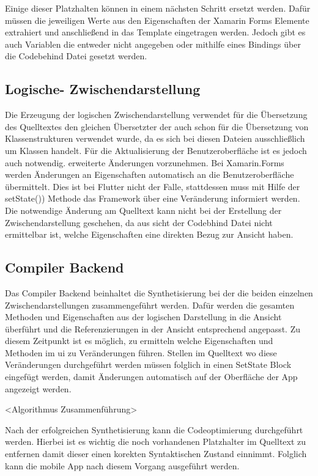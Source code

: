  

Einige dieser Platzhalten können in einem nächsten Schritt ersetzt werden.  Dafür müssen die jeweiligen Werte aus den Eigenschaften der Xamarin Forms Elemente extrahiert und anschließend in das Template eingetragen werden.  Jedoch gibt es auch Variablen die entweder nicht angegeben oder mithilfe eines Bindings über die Codebehind Datei gesetzt werden.   

\subsection{Logische- Zwischendarstellung}
Die Erzeugung der logischen Zwischendarstellung verwendet für die Übersetzung des \Csharp Quelltextes den gleichen Übersetzter der auch schon für die Übersetzung von Klassenstrukturen verwendet wurde,  da es sich bei diesen Dateien ausschließlich um \Csharp Klassen handelt.  Für die Aktualisierung der Benutzeroberfläche ist es jedoch auch notwendig. erweiterte Änderungen vorzunehmen.  Bei Xamarin.Forms werden Änderungen an Eigenschaften automatisch an die Benutzeroberfläche übermittelt. Dies ist bei Flutter nicht der Falle,  stattdessen muss mit Hilfe der setState()) Methode das Framework über eine Veränderung informiert werden.  Die notwendige Änderung am Quelltext kann nicht bei der Erstellung der Zwischendarstellung geschehen, da aus sicht der Codebhind Datei nicht ermittelbar ist,  welche Eigenschaften eine direkten Bezug zur Ansicht haben. 


\subsection{Compiler Backend}
Das Compiler Backend beinhaltet die Synthetisierung bei der die beiden einzelnen Zwischendarstellungen zusammengeführt werden.  Dafür werden die gesamten Methoden und Eigenschaften aus der logischen Darstellung in die Ansicht überführt und die Referenzierungen in der Ansicht entsprechend angepasst.  Zu diesem Zeitpunkt ist es möglich,  zu ermitteln welche Eigenschaften und Methoden im \ac{ui} zu Veränderungen führen.  Stellen im Quelltext wo diese Veränderungen durchgeführt werden müssen folglich in einen SetState Block eingefügt werden,  damit Änderungen automatisch auf der Oberfläche der App angezeigt werden.

<Algorithmus Zusammenführung>


Nach der erfolgreichen Synthetisierung kann die Codeoptimierung durchgeführt werden.  Hierbei ist es wichtig die noch vorhandenen Platzhalter im Quelltext zu entfernen damit dieser einen korekten Syntaktischen Zustand einnimmt.  Folglich kann die mobile App nach diesem Vorgang ausgeführt werden. 

